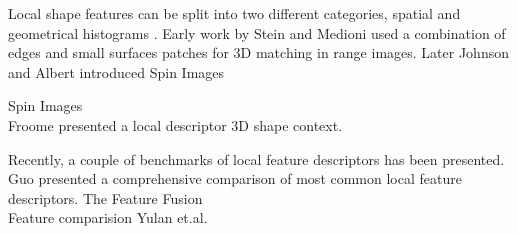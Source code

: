 \documentclass[10pt,twocolumn,letterpaper]{article}
\begin{document}
Local shape features can be split into two different categories, spatial and geometrical histograms \cite{Guo2015}. 
Early work by Stein and Medioni \cite{Stein1992} used a combination of edges and small surfaces patches for 3D matching in range images. Later Johnson  and Albert introduced Spin Images \cite{Johnson1999} 

Spin Images \cite{Johnson1999}\\
Froome \etal \cite{Frome2004} presented a local descriptor 3D shape context.


Recently, a couple of benchmarks of local feature descriptors has been presented. Guo \etal \cite{Guo2015} presented a comprehensive comparison of most common local feature descriptors. The 
Feature Fusion \cite{Buch2016}\\
Feature comparision Yulan et.al. \cite{Guo2015}



\end{document}

